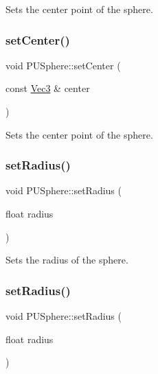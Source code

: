 Sets the center point of the sphere. \mbox{\label{classPUSphere_ae656af3bcf247af6b4c21b303e543441}} 
\subsubsection{\texorpdfstring{set\+Center()}{setCenter()}\hspace{0.1cm}{\footnotesize\ttfamily [2/2]}}
{\footnotesize\ttfamily void P\+U\+Sphere\+::set\+Center (\begin{DoxyParamCaption}\item[{const \hyperlink{classVec3}{Vec3} \&}]{center }\end{DoxyParamCaption})\hspace{0.3cm}{\ttfamily [inline]}}

Sets the center point of the sphere. \mbox{\label{classPUSphere_ab3161b9e553ed38c311fd4bff5dba3f9}} 
\subsubsection{\texorpdfstring{set\+Radius()}{setRadius()}\hspace{0.1cm}{\footnotesize\ttfamily [1/2]}}
{\footnotesize\ttfamily void P\+U\+Sphere\+::set\+Radius (\begin{DoxyParamCaption}\item[{float}]{radius }\end{DoxyParamCaption})\hspace{0.3cm}{\ttfamily [inline]}}

Sets the radius of the sphere. \mbox{\label{classPUSphere_ab3161b9e553ed38c311fd4bff5dba3f9}} 
\subsubsection{\texorpdfstring{set\+Radius()}{setRadius()}\hspace{0.1cm}{\footnotesize\ttfamily [2/2]}}
{\footnotesize\ttfamily void P\+U\+Sphere\+::set\+Radius (\begin{DoxyParamCaption}\item[{float}]{radius }\end{DoxyParamCaption})\hspace{0.3cm}{\ttfamily [inline]}}

